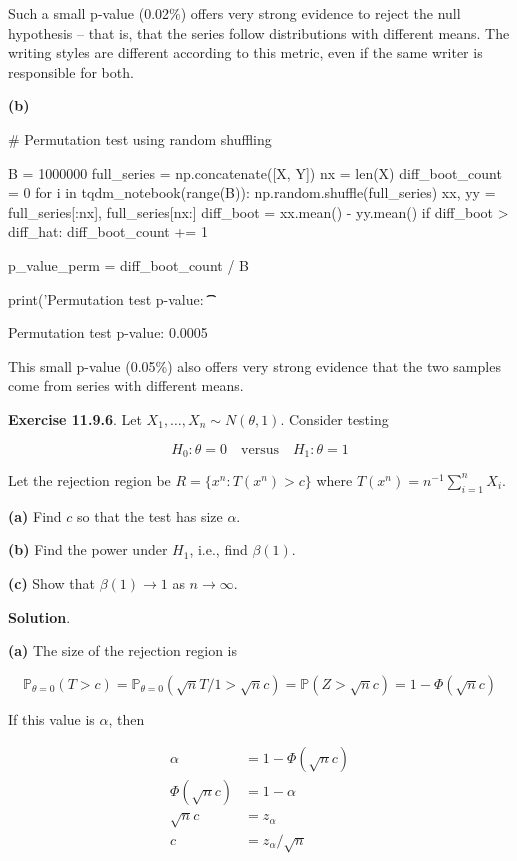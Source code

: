 Such a small p-value (0.02\%) offers very strong evidence to reject the
null hypothesis -- that is, that the series follow distributions with
different means. The writing styles are different according to this
metric, even if the same writer is responsible for both.

\textbf{(b)}

\begin{python}
# Permutation test using random shuffling

B = 1000000
full_series = np.concatenate([X, Y])
nx = len(X)
diff_boot_count = 0
for i in tqdm_notebook(range(B)):
    np.random.shuffle(full_series)
    xx, yy = full_series[:nx], full_series[nx:]
    diff_boot = xx.mean() - yy.mean()
    if diff_boot > diff_hat:
        diff_boot_count += 1
        
p_value_perm = diff_boot_count / B

print('Permutation test p-value: \t\t %
\end{python}


\begin{console}
Permutation test p-value:                0.0005
\end{console}

This small p-value (0.05\%) also offers very strong evidence that the
two samples come from series with different means.

\textbf{Exercise 11.9.6}. Let \(X_1, \dots, X_n \sim N(\theta, 1)\).
Consider testing

\[ H_0: \theta = 0 \quad \text{versus} \quad H_1: \theta = 1\]

Let the rejection region be \(R = \{ x^n : T(x^n) > c \}\) where
\(T(x^n) = n^{-1} \sum_{i=1}^n X_i\).

\textbf{(a)} Find \(c\) so that the test has size \(\alpha\).

\textbf{(b)} Find the power under \(H_1\), i.e., find \(\beta(1)\).

\textbf{(c)} Show that \(\beta(1) \rightarrow 1\) as
\(n \rightarrow \infty\).

\textbf{Solution}.

\textbf{(a)} The size of the rejection region is

\[\mathbb{P}_{\theta = 0}(T > c) = \mathbb{P}_{\theta = 0}(\sqrt{n}T / 1 > \sqrt{n}c) = \mathbb{P}(Z > \sqrt{n} c) = 1 - \Phi(\sqrt{n}c)\]

If this value is \(\alpha\), then

\begin{align}
\alpha &= 1 - \Phi(\sqrt{n}c) \\
\Phi(\sqrt{n}c) &= 1 - \alpha \\
\sqrt{n}c &= z_{\alpha} \\
c &= z_{\alpha} / \sqrt{n}
\end{align}


